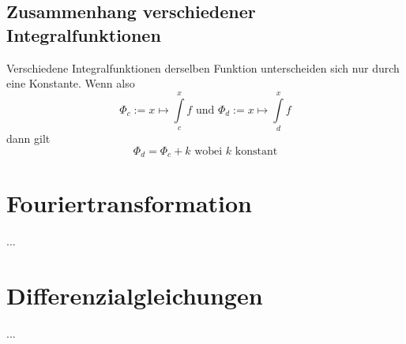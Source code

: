 \documentclass[10pt,a4paper]{article}
\begin{document}
\subsection{Zusammenhang verschiedener Integralfunktionen}

Verschiedene Integralfunktionen derselben Funktion unterscheiden sich nur durch
eine Konstante. Wenn also
$$\Phi_c := x \mapsto \int\limits_c^x f \textrm{ und } \Phi_d := x \mapsto
    \int\limits_d^x f$$
dann gilt
$$\Phi_d = \Phi_c + k \textrm{ wobei } k \textrm{ konstant}$$



\section{Fouriertransformation}

...


\section{Differenzialgleichungen}

...
\end{document}
